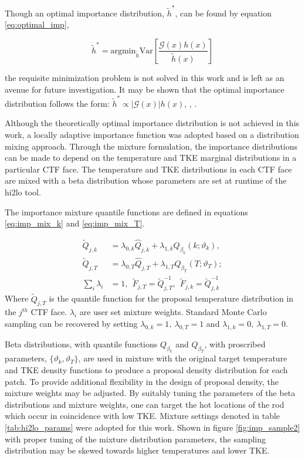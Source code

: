Though an optimal importance distribution, $\tilde{h}^* $, can be found by equation \ref{eq:optimal_imp},

\begin{equation}
\tilde{h}^* = \mathrm{argmin}_{\tilde{h}}\mathrm{Var} \left[ \frac{\mathcal{G}(x)h(x)}{\tilde{h}(x)} \right] 
\label{eq:optimal_imp}
\end{equation}

the requisite minimization problem is not solved in this work and is left as an avenue for future investigation. It may be shown that the optimal importance distribution follows the form: $\tilde{h}^* \propto |\mathcal{G}(x)|h(x)$, \cite{rubinstein2011}, \cite{mcbook}.

Although the theoretically optimal importance distribution is not achieved in this work, a locally adaptive importance function was adopted based on a distribution mixing approach.  Through the mixture formulation, the importance distributions can be made to depend on the temperature and TKE marginal distributions in a particular CTF face.  The temperature and TKE distributions in each CTF face are mixed with a beta distribution whose parameters are set at runtime of the hi2lo tool.  

The importance  mixture quantile functions are defined in equations \ref{eq:imp_mix_k} and \ref{eq:imp_mix_T}.

\begin{align}
\tilde Q_{j,k} &= \lambda_{0,k} \hat Q_{j,k}  + \lambda_{1,k} Q_{\beta_k}(k; \vartheta_k),  \label{eq:imp_mix_k} \\
\tilde Q_{j,T} &= \lambda_{0,T} \hat Q_{j,T}  + \lambda_{1,T} Q_{\beta_T}(T; \vartheta_T);  \label{eq:imp_mix_T} \\
\sum_i \lambda_i &= 1, \ \ \tilde F_{j,T} = \tilde Q^{-1}_{j,T},\ \  \tilde F_{j,k} = \tilde Q^{-1}_{j,k}
\label{eq:imp_mix_dists}
\end{align}
Where $\tilde Q_{j,T}$ is the quantile function for the proposal temperature distribution in the $j^{th}$ CTF face. $\lambda_i$ are user set mixture weights. Standard Monte Carlo sampling can be recovered by setting $\lambda_{0,k}=1,\ \lambda_{0,T}=1$ and  $\lambda_{1,k}=0,\ \lambda_{1,T}=0$.

Beta distributions, with quantile functions $Q_{\beta_k}$ and $Q_{\beta_T}$,  with proscribed parameters, $\{ \vartheta_k, \vartheta_T \}$, are used in mixture with the original target temperature and TKE density functions to produce a proposal density distribution for each patch.  To provide additional flexibility in the design of proposal density, the mixture weights may be adjusted. By suitably tuning the parameters of the beta distributions and mixture weights, one can target the hot locations of the rod which occur in coincidence with low TKE.  Mixture settings denoted in table \ref{tab:hi2lo_params} were adopted for this work.  Shown in figure \ref{fig:imp_sample2} with proper tuning of the mixture distribution parameters, the sampling distribution may be skewed towards higher temperatures and lower TKE.

